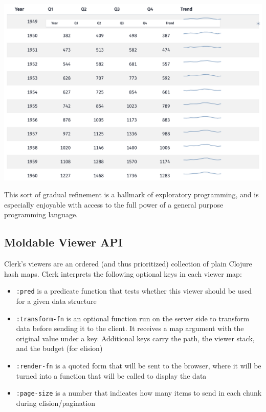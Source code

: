 \documentclass[sigconf,screen]{acmart}
\newcommand{\passthrough}[1]{#1}
\providecommand{\tightlist}{%
  \setlength{\itemsep}{0pt}\setlength{\parskip}{0pt}}
\begin{document}
\includegraphics{images/anon-expr-5dsSs4YJ9LYoxsu8USvFMpW5wGuDa3-result.png}

This sort of gradual refinement is a hallmark of exploratory programming, and is especially enjoyable with access to the full power of a general purpose programming language.

\hypertarget{id}{%
\subsection{Moldable Viewer API}\label{id}}

Clerk's viewers are an ordered (and thus prioritized) collection of plain Clojure hash maps. Clerk interprets the following optional keys in each viewer map:

\begin{itemize}
\tightlist
\item
  \passthrough{\lstinline!:pred!} is a predicate function that tests whether this viewer should be used for a given data structure
\item
  \passthrough{\lstinline!:transform-fn!} is an optional function run on the server side to transform data before sending it to the client. It receives a map argument with the original value under a key. Additional keys carry the path, the viewer stack, and the budget (for elision)
\item
  \passthrough{\lstinline!:render-fn!} is a quoted form that will be sent to the browser, where it will be turned into a function that will be called to display the data
\item
  \passthrough{\lstinline!:page-size!} is a number that indicates how many items to send in each chunk during elision/pagination
\end{itemize}
\end{document}
